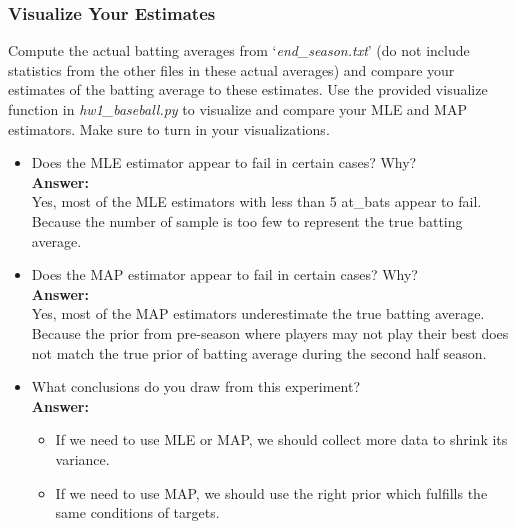 \documentclass{article}
\begin{document}
\subsubsection*{Visualize Your Estimates}

Compute the actual batting averages from `\textit{end\_season.txt}' (do not include statistics from the other files in these actual averages) and compare your estimates of the batting average to these estimates. Use the provided visualize function in \textit{hw1\_baseball.py} to visualize and compare your MLE and MAP estimators. Make sure to turn in your visualizations.


\begin{itemize}
	\item Does the MLE estimator appear to fail in certain cases? Why?
	\\\textbf{Answer:}\\
	Yes, most of the MLE estimators with less than 5 at\_bats appear to fail. Because the number of sample is too few to represent the true batting average.
	
	\item Does the MAP estimator appear to fail in certain cases? Why?
	\\\textbf{Answer:}\\
	Yes, most of the MAP estimators underestimate the true batting average. Because the prior from pre-season where players may not play their best does not match the true prior of batting average during the second half season.
	
	\item What conclusions do you draw from this experiment?
	\\\textbf{Answer:}\\
	\begin{itemize}
		\item If we need to use MLE or MAP, we should collect more data to shrink its variance.
		\item If we need to use MAP, we should use the right prior which fulfills the same conditions of targets.
	\end{itemize}
\end{itemize}
\end{document}
